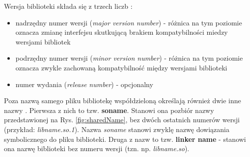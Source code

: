 Wersja biblioteki składa się z trzech liczb \cite{TLDP}: 
\begin{itemize}
\item nadrzędny numer wersji (\textit{major version number}) - różnica na tym poziomie oznacza zmianę interfejsu skutkującą brakiem kompatybilności miedzy wersjami bibliotek
\item podrzędny numer wersji (\textit{minor version number}) - różnica na tym poziomie oznacza zwykle zachowaną kompatybilność między wersjami biblioteki
\item numer wydania (\textit{release number}) - opcjonalny
\end{itemize}

Poza nazwą samego pliku bibliotekę współdzieloną określają również dwie inne nazwy \cite{SharedNames}. Pierwsza z nich to tzw. \textbf{soname}. Stanowi ona pozbiór nazwy przedstawionej na Rys. \ref{fig:sharedName}, bez dwóch ostatnich numerów wersji (przykład: \textit{libname.so.1}). Nazwa \textit{soname} stanowi zwyklę nazwę dowiązania symbolicznego do pliku biblioteki. Druga z nazw to tzw. \textbf{linker name} - stanowi ona nazwę biblioteki bez numeru wersji (tzn. np. \textit{libname.so}).


